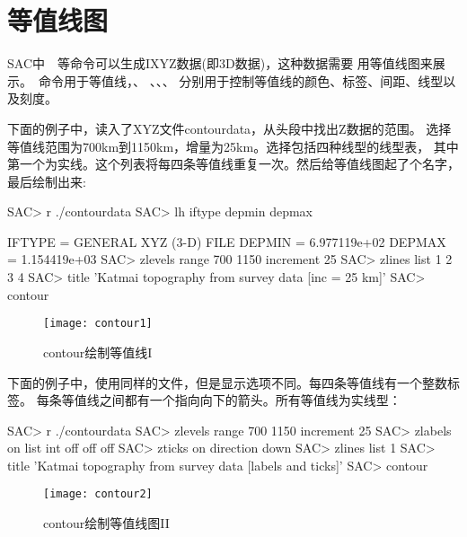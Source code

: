 \section{等值线图}
\label{sec:contour}
SAC中~~等命令可以生成IXYZ数据(即3D数据)，这种数据需要
用等值线图来展示。~命令用于等值线，、
、、、
分别用于控制等值线的颜色、标签、间距、线型以及刻度。

下面的例子中，读入了XYZ文件contourdata，从头段中找出Z数据的范围。
选择等值线范围为700km到1150km，增量为25km。选择包括四种线型的线型表，
其中第一个为实线。这个列表将每四条等值线重复一次。然后给等值线图起了个名字，最后绘制出来:
\begin{SACCode}
SAC> r ./contourdata
SAC> lh iftype depmin depmax

       IFTYPE = GENERAL XYZ (3-D) FILE
       DEPMIN = 6.977119e+02
       DEPMAX = 1.154419e+03
SAC> zlevels range 700 1150 increment 25
SAC> zlines list 1 2 3 4
SAC> title 'Katmai topography from survey data [inc = 25 km]'
SAC> contour
\end{SACCode}

\begin{figure}[H]
\centering
\texttt{[image: contour1]}
\caption{contour绘制等值线I}
\end{figure}

下面的例子中，使用同样的文件，但是显示选项不同。每四条等值线有一个整数标签。
每条等值线之间都有一个指向向下的箭头。所有等值线为实线型：
\begin{SACCode}
SAC> r ./contourdata
SAC> zlevels range 700 1150 increment 25
SAC> zlabels on list int off off off
SAC> zticks on direction down
SAC> zlines list 1
SAC> title 'Katmai topography from survey data [labels and ticks]'
SAC> contour
\end{SACCode}

\begin{figure}[H]
\centering
\texttt{[image: contour2]}
\caption{contour绘制等值线图II}
\end{figure}
